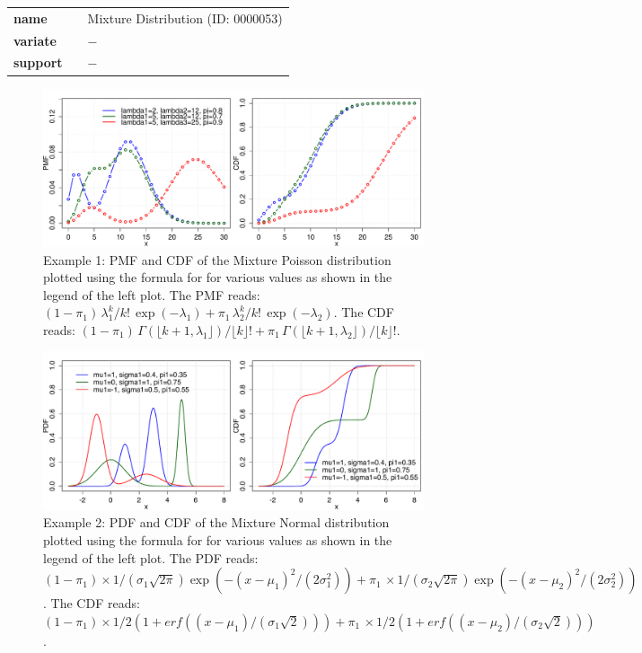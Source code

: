   \bigskip 

\begin{tabular}{p{2cm}cl}
\textbf{name} & & Mixture Distribution (ID: 0000053)\\ 
 
\textbf{variate} & & $-$ \\ 

\textbf{support} & & $-$
\end{tabular}

\begin{figure}[htb!]
\centering
  \includegraphics[width=140mm]{pics/MixturePoisson.pdf}
 \caption{Example 1: PMF and CDF of the Mixture Poisson distribution plotted using the formula for 
 for various values as shown in the legend of the left plot. The PMF reads: $(1\!-\!\pi_1) \,\lambda_1^k/k! \,\exp(-\lambda_1) + \pi_1\,\lambda_2^k / k! \, \exp(-\lambda_2)$. The CDF reads: $(1-\pi_1)\,\Gamma(\lfloor k+1 , \lambda_1 \rfloor) / \lfloor k \rfloor!+\pi_1 \,\Gamma(\lfloor k+1 , \lambda_2 \rfloor) / \lfloor k \rfloor!$.}
 \label{fig:MixturePoisson_pmf_cdf}
\end{figure}
\begin{figure}[htb!]
\centering
  \includegraphics[width=140mm]{pics/MixtureNormal.pdf}
 \caption{Example 2: PDF and CDF of the Mixture Normal distribution plotted using the formula for 
 for various values as shown in the legend of the left plot. The PDF reads: $(1\!-\!\pi_1)\times1/(\sigma_1\sqrt{2\pi})\exp(-(x-\mu_1)^2/(2\sigma_1^2)) + \pi_1\,\times1/(\sigma_2\sqrt{2\pi})\exp(-(x-\mu_2)^2/(2\sigma_2^2))$. The CDF reads: $(1\!-\!\pi_1)\times1/2 (1 + erf((x-\mu_1)/(\sigma_1\sqrt{2})))  + \pi_1\,\times1/2  (1 + erf((x-\mu_2)/(\sigma_2\sqrt{2})))$.}
 \label{fig:MixtureNormal_pdf_cdf}
\end{figure}

